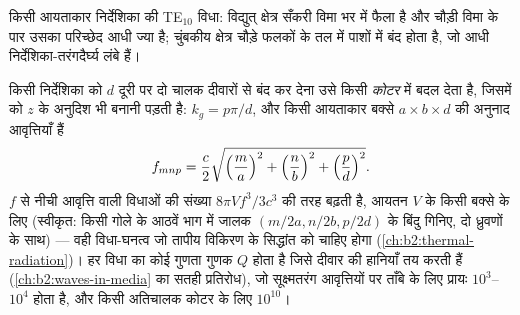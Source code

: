 \begin{omfigure}

{\small किसी आयताकार निर्देशिका की TE$_{10}$ विधा: विद्युत् क्षेत्र सँकरी
विमा भर में फैला है और चौड़ी विमा के पार उसका परिच्छेद आधी ज्या है;
चुंबकीय क्षेत्र चौड़े फलकों के तल में पाशों में बंद होता है, जो आधी
निर्देशिका-तरंगदैर्घ्य लंबे हैं।}
\end{omfigure}

\begin{proposition}[कोटर अनुनादक]\label{prop:b2:guided-waves:cavity}
किसी निर्देशिका को $d$ दूरी पर दो चालक दीवारों से बंद कर देना उसे किसी
\emph{कोटर} में बदल देता है, जिसमें  को $z$ के अनुदिश भी  बनानी पड़ती है: $k_g = p\pi/d$, और किसी आयताकार बक्से
$a \times b \times d$ की अनुनाद आवृत्तियाँ हैं
\[
f_{mnp} = \frac c2\sqrt{\Bigl(\frac ma\Bigr)^2 + \Bigl(\frac nb\Bigr)^2 + \Bigl(\frac pd\Bigr)^2} .
\]
$f$ से नीची आवृत्ति वाली विधाओं की संख्या
$8\pi V f^3/3c^3$ की तरह बढ़ती है, आयतन $V$ के किसी बक्से के लिए (स्वीकृत: किसी गोले के आठवें भाग में जालक
$(m/2a, n/2b, p/2d)$ के बिंदु गिनिए, दो ध्रुवणों के साथ)
--- वही विधा-घनत्व जो तापीय विकिरण के सिद्धांत को
चाहिए होगा (\cref{ch:b2:thermal-radiation})। हर विधा का कोई गुणता गुणक
$Q$ होता है जिसे दीवार की हानियाँ तय करती हैं (\cref{ch:b2:waves-in-media}
का सतही प्रतिरोध), जो सूक्ष्मतरंग आवृत्तियों पर ताँबे के लिए प्रायः
$10^3$--$10^4$ होता है, और किसी अतिचालक कोटर के लिए $10^{10}$।
\end{proposition}

